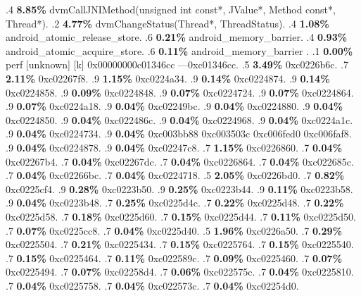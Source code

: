 \begin{profile}
{.4 \textbf{8.85\%} dvmCallJNIMethod(unsigned int const*, JValue*, Method const*, Thread*). 
.2 \textbf{4.77\%} dvmChangeStatus(Thread*, ThreadStatus). 
.4 \textbf{1.08\%} android\_atomic\_release\_store. 
.6 \textbf{0.21\%} android\_memory\_barrier. 
.4 \textbf{0.93\%} android\_atomic\_acquire\_store. 
.6 \textbf{0.11\%} android\_memory\_barrier\newline {} . 
.1 \textbf{ 0.00\%} perf             [unknown]              [k] 0x00000000c01346cc\newline {} ---0xc01346cc. 
.5 \textbf{3.49\%} 0xc0226b6c. 
.7 \textbf{2.11\%} 0xc02267f8. 
.9 \textbf{1.15\%} 0xc0224a34. 
.9 \textbf{0.14\%} 0xc0224874. 
.9 \textbf{0.14\%} 0xc0224858. 
.9 \textbf{0.09\%} 0xc0224848. 
.9 \textbf{0.07\%} 0xc0224724. 
.9 \textbf{0.07\%} 0xc0224864. 
.9 \textbf{0.07\%} 0xc0224a18. 
.9 \textbf{0.04\%} 0xc02249bc. 
.9 \textbf{0.04\%} 0xc0224880. 
.9 \textbf{0.04\%} 0xc0224850. 
.9 \textbf{0.04\%} 0xc022486c. 
.9 \textbf{0.04\%} 0xc0224968. 
.9 \textbf{0.04\%} 0xc0224a1c. 
.9 \textbf{0.04\%} 0xc0224734. 
.9 \textbf{0.04\%} 0xc003bb88\newline {} 0xc003503c\newline {} 0xc006fed0\newline {} 0xc006faf8. 
.9 \textbf{0.04\%} 0xc0224878. 
.9 \textbf{0.04\%} 0xc02247c8. 
.7 \textbf{1.15\%} 0xc0226860. 
.7 \textbf{0.04\%} 0xc02267b4. 
.7 \textbf{0.04\%} 0xc02267dc. 
.7 \textbf{0.04\%} 0xc0226864. 
.7 \textbf{0.04\%} 0xc022685c. 
.7 \textbf{0.04\%} 0xc02266bc. 
.7 \textbf{0.04\%} 0xc0224718. 
.5 \textbf{2.05\%} 0xc0226bd0. 
.7 \textbf{0.82\%} 0xc0225cf4. 
.9 \textbf{0.28\%} 0xc0223b50. 
.9 \textbf{0.25\%} 0xc0223b44. 
.9 \textbf{0.11\%} 0xc0223b58. 
.9 \textbf{0.04\%} 0xc0223b48. 
.7 \textbf{0.25\%} 0xc0225d4c. 
.7 \textbf{0.22\%} 0xc0225d48. 
.7 \textbf{0.22\%} 0xc0225d58. 
.7 \textbf{0.18\%} 0xc0225d60. 
.7 \textbf{0.15\%} 0xc0225d44. 
.7 \textbf{0.11\%} 0xc0225d50. 
.7 \textbf{0.07\%} 0xc0225cc8. 
.7 \textbf{0.04\%} 0xc0225d40. 
.5 \textbf{1.96\%} 0xc0226a50. 
.7 \textbf{0.29\%} 0xc0225504. 
.7 \textbf{0.21\%} 0xc0225434. 
.7 \textbf{0.15\%} 0xc0225764. 
.7 \textbf{0.15\%} 0xc0225540. 
.7 \textbf{0.15\%} 0xc0225464. 
.7 \textbf{0.11\%} 0xc022589c. 
.7 \textbf{0.09\%} 0xc0225460. 
.7 \textbf{0.07\%} 0xc0225494. 
.7 \textbf{0.07\%} 0xc02258d4. 
.7 \textbf{0.06\%} 0xc022575c. 
.7 \textbf{0.04\%} 0xc0225810. 
.7 \textbf{0.04\%} 0xc0225758. 
.7 \textbf{0.04\%} 0xc022573c. 
.7 \textbf{0.04\%} 0xc02254d0. 
}
\end{profile}
